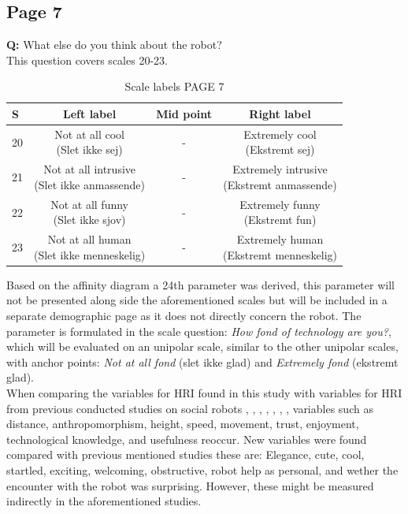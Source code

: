 \subsection{Page 7}
\noindent
\textbf{Q:} What else do you think about the robot?\\%
This question covers scales 20-23. 
%
\begin{table}[H]
	\centering
\caption{Scale labels PAGE 7}
	\label{tab:ScalesPage7} 
	\begin{tabular}{l|c|c|c}
		S    & Left label & Mid point & Right label \\\hline
		20   & \makecell{Not at all cool\\(Slet ikke sej)}  & - & \makecell{Extremely cool \\(Ekstremt sej)}        \\\hline
		21   & \makecell{Not at all intrusive \\(Slet ikke anmassende)} & - & \makecell{Extremely intrusive \\(Ekstremt anmassende)}         \\\hline
		22   & \makecell{Not at all funny\\(Slet ikke sjov)} & - & \makecell{Extremely funny \\(Ekstremt fun)}         \\\hline
	 	23   & \makecell{Not at all human \\(Slet ikke menneskelig)} & - & \makecell{Extremely human \\(Ekstremt menneskelig)}               
	\end{tabular}        
\end{table}
\noindent
%
Based on the affinity diagram a 24th parameter was derived, this parameter will not be presented along side the aforementioned scales but will be included in a separate demographic page as it does not directly concern the robot. The parameter is formulated in the scale question: \textit{How fond of technology are you?}, which will be evaluated on an unipolar scale, similar to the other unipolar scales, with anchor points: \textit{Not at all fond} (slet ikke glad) and \textit{Extremely fond} (ekstremt glad).\\  

\noindent
When comparing the variables for HRI found in this study with variables for HRI from previous conducted studies on social robots \cite{PDF:ExploringInfluencingVariable}, \cite{PDF:SharingALifeHarvey}, \cite{PDF:InTheCompanyofRobots}, \cite{PDF:CloseButNotStuck}, \cite{PDF:TheImpactOfTraveler}, \cite{PDF:HumanRobotEmodiedInteraction}, \cite{PDF:RecommendationEffects}, variables such as distance, anthropomorphism, height, speed, movement, trust, enjoyment, technological knowledge, and usefulness reoccur. New variables were found compared with previous mentioned studies these are: Elegance, cute, cool, startled, exciting, welcoming, obstructive, robot help as personal, and wether the encounter with the robot was surprising. However, these might be measured indirectly in the aforementioned studies.

